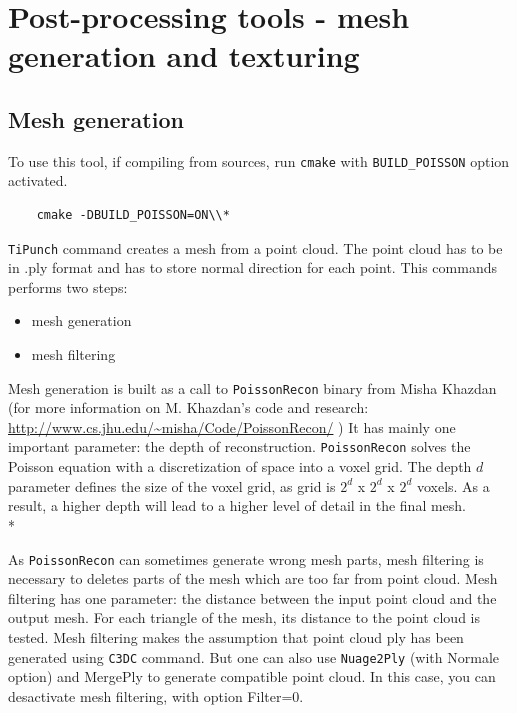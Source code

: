 
\section{Post-processing tools - mesh generation and texturing}

\subsection{Mesh generation}

To use this tool, if compiling from sources, run {\tt cmake} with {\tt BUILD\_POISSON} option activated.
\begin{verbatim}
    cmake -DBUILD_POISSON=ON\\*
\end{verbatim}

{\tt TiPunch} command creates a mesh from a point cloud. The point cloud has to be in .ply format and has to store normal direction for each point.
This commands performs two steps:
\begin{itemize}
\item mesh generation
\item mesh filtering
\end{itemize}
Mesh generation is built as a call to {\tt PoissonRecon} binary from Misha Khazdan (for more information on M. Khazdan's code and research: \url{http://www.cs.jhu.edu/~misha/Code/PoissonRecon/} )
It has mainly one important parameter: the depth of reconstruction. {\tt PoissonRecon} solves the Poisson equation with a discretization of space into a voxel grid. The depth $d$ parameter defines the size of the voxel grid, as grid is $2^d$ x $2^d$ x $2^d$ voxels.
As a result, a higher depth will lead to a higher level of detail in the final mesh.\\*

As {\tt PoissonRecon} can sometimes generate wrong mesh parts, mesh filtering is necessary to deletes parts of the mesh which are too far from point cloud.
Mesh filtering has one parameter: the distance between the input point cloud and the output mesh. For each triangle of the mesh, its distance to the point cloud is tested.
Mesh filtering makes the assumption that point cloud ply has been generated using {\tt C3DC} command. But one can also use {\tt Nuage2Ply} (with Normale option) and MergePly to generate compatible point cloud. In this case, you can desactivate mesh filtering, with option Filter=0.

